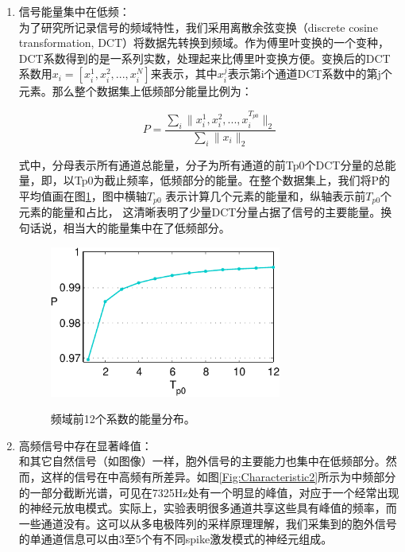 \begin{enumerate}
\item{信号能量集中在低频：}\\
为了研究所记录信号的频域特性，我们采用离散余弦变换（discrete cosine transformation, DCT）将数据先转换到频域。作为傅里叶变换的一个变种，DCT系数得到的是一系列实数，处理起来比傅里叶变换方便。变换后的DCT系数用${x_i} = [x_i^{1},x_i^{2},...,x_i^{N}]$来表示，其中$x_i^j$表示第i个通道DCT系数中的第j个元素。那么整个数据集上低频部分能量比例为：

\begin{equation}\label{Eq:power Definition}
  P = \frac{\sum_i \|x_i^{1},x_i^{2},...,x_i^{T_{p0}}\|_2}{\sum_i \|x_i\|_2}
\end{equation}
 
式中，分母表示所有通道总能量，分子为所有通道的前Tp0个DCT分量的总能量，即，以Tp0为截止频率，低频部分的能量。在整个数据集上，我们将P的平均值画在图\ref{Fig:Characteristic1}，图中横轴$T_{p0}$ 表示计算几个元素的能量和，纵轴表示前$T_{p0}$个元素的能量和占比， 这清晰表明了少量DCT分量占据了信号的主要能量。换句话说，相当大的能量集中在了低频部分。

\begin{figure}
  \centering
  \includegraphics[width=3in]{Pictures/Compression/f1-crop.pdf}\\
  \caption{频域前12个系数的能量分布。}\label{Fig:Characteristic1}
\end{figure}


\item{高频信号中存在显著峰值：}\\
和其它自然信号（如图像）一样，胞外信号的主要能力也集中在低频部分。然而，这样的信号在中高频有所差异。如图\ref{Fig:Characteristic2}所示为中频部分的一部分截断光谱，可见在7325Hz处有一个明显的峰值，对应于一个经常出现的神经元放电模式。实际上，实验表明很多通道共享这些具有峰值的频率，而一些通道没有。这可以从多电极阵列的采样原理理解，我们采集到的胞外信号的单通道信息可以由3至5个有不同spike激发模式的神经元组成。


\end{enumerate}
